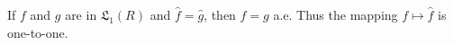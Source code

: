 If $f$ and $g$ are in $\mathfrak{L}_1(R)$ and $\hat{f} = \hat{g}$, then $f = g$ a.e. Thus the mapping $f \mapsto \hat{f}$ is one-to-one.
